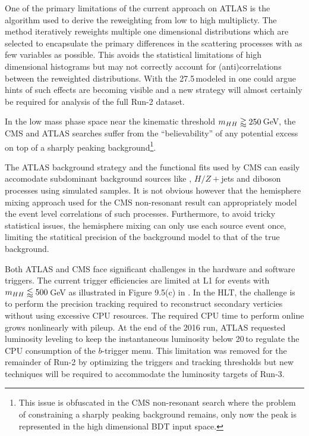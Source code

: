 One of the primary limitations of the current approach on ATLAS is the algorithm used to derive the reweighting from low to high \bjet multiplicty.
The method iteratively reweights multiple one dimensional distributions which are selected to encapsulate the primary differences in the scattering processes with as few variables as possible.
This avoids the statistical limitations of high dimensional histograms but may not correctly account for (anti)correlations between the reweighted distributions.
With the 27.5\,\ifb modeled in \cite{Aaboud:2018knk,Bryant:2644551} one could argue hints of such effects are becoming visible and a new strategy will almost certainly be required for analysis of the full Run-2 dataset. 

In the low mass phase space near the kinematic threshold $m_{HH}\gtrapprox 250\,$GeV, the CMS and ATLAS searches suffer from the ``believability'' of any potential excess on top of a sharply peaking background\footnote{
  This issue is obfuscated in the CMS non-resonant search where the problem of constraining a sharply peaking background remains, only now the peak is represented in the high dimensional BDT input space.
}.

The ATLAS background strategy and the functional fits used by CMS can easily accomodate subdominant background sources like \ttbar, $H/Z+$jets and diboson processes using simulated samples.
It is not obvious however that the hemisphere mixing approach used for the CMS non-resonant result can appropriately model the event level correlations of such processes.
Furthermore, to avoid tricky statistical issues, the hemisphere mixing can only use each source event once, limiting the statitical precision of the background model to that of the true background. 

Both ATLAS and CMS face significant challenges in the hardware and software triggers.
The current trigger efficiencies are limited at L1 for events with $m_{HH}\lessapprox 500\,$GeV as illustrated in Figure 9.5(c) in \cite{Bryant:2644551}.
In the HLT, the challenge is to perform the precision tracking required to reconstruct secondary verticies without using excessive CPU resources.
The required CPU time to perform online \btagging grows nonlinearly with pileup.
At the end of the 2016 run, ATLAS requested luminosity leveling to keep the instantaneous luminosity below 20\,\inbs to regulate the CPU consumption of the $b$-trigger menu.
This limitation was removed for the remainder of Run-2 by optimizing the triggers and tracking thresholds but new techniques will be required to accommodate the luminosity targets of Run-3.


